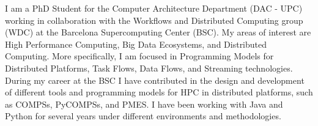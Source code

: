 %
%
%

\par{
I am a PhD Student for the Computer Architecture Department (DAC - UPC) working in collaboration with the Workflows and Distributed Computing group (WDC) at the Barcelona Supercomputing Center (BSC). My areas of interest are High Performance Computing, Big Data Ecosystems, and Distributed Computing. More specifically, I am focused in Programming Models for Distributed Platforms, Task Flows, Data Flows, and Streaming technologies. During my career at the BSC I have contributed in the design and development of different tools and programming models for HPC in distributed platforms, such as COMPSs, PyCOMPSs, and PMES. I have been working with Java and Python for several years under different environments and methodologies.
}

\vspace{1em}
